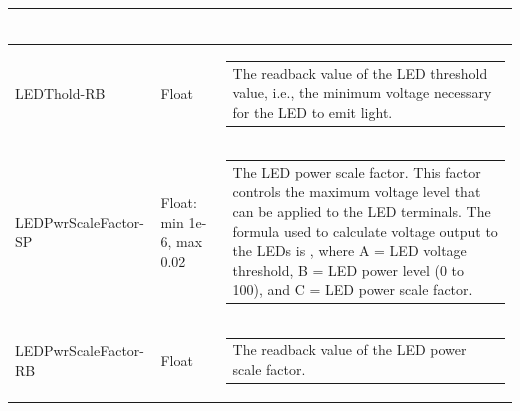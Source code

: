 \documentclass[openany]{article}
\begin{document}
\begin{longtable}{| m{4.5cm} m{2.5cm}  m{7.0cm} |}
\begin{tabular}{@{}m{6cm}@{}}
            \end{tabular} \hypertarget{}{}\\ \hline
        LEDThold-RB & Float & \begin{tabular}{@{}m{6cm}@{}}
                The readback value of the LED threshold value, i.e., the minimum voltage necessary for the LED to emit light.
            \end{tabular} \hypertarget{pv:led-pwr-scale-factor}{}\\ \hline
        LEDPwrScaleFactor-SP & Float: min 1e-6, max 0.02 & \begin{tabular}{@{}m{6cm}@{}}
                The LED power scale factor. This factor controls the maximum voltage level that can be applied to the LED terminals. The formula used to calculate voltage output to the LEDs is $A.e^{B.C}$, where A = LED voltage threshold, B = LED power level (0 to 100), and C = LED power scale factor.
            \end{tabular} \hypertarget{}{}\\ \hline
        LEDPwrScaleFactor-RB & Float & \begin{tabular}{@{}m{6cm}@{}}
                The readback value of the LED power scale factor.
            \end{tabular} \hypertarget{}{}\\ \hline
    \end{longtable}
\end{document}
